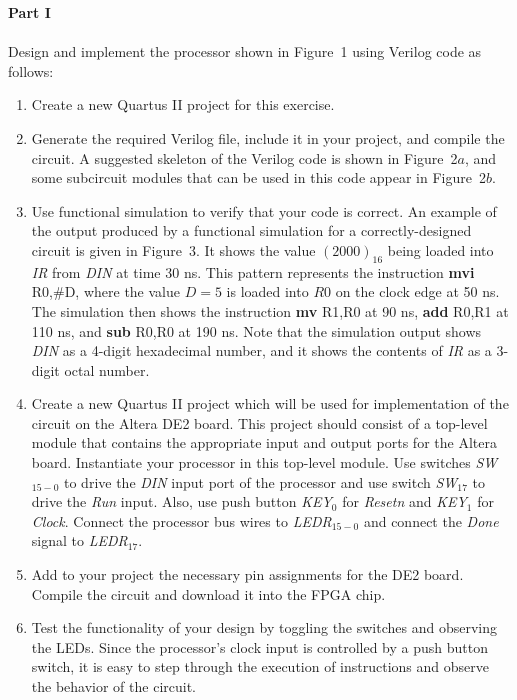 \documentclass[epsfig,10pt,fullpage]{article}
\begin{document}
\pagebreak
\noindent
{\bf Part I}
~\\
~\\
\noindent
Design and implement the processor shown in Figure~1 using Verilog code as follows:
\begin{enumerate}
\item Create a new Quartus II project for this exercise.
\item Generate the required Verilog file, include it in your project, 
and compile the circuit. A suggested skeleton of the Verilog code is shown in Figure~2$a$,
and some subcircuit modules that can be used in this code appear in Figure~2$b$.
\item Use functional simulation to verify that your code is correct. An example of the output
produced by a functional simulation for a correctly-designed circuit is given in Figure~3.
It shows the value ${(2000)}_{16}$ being loaded into {\it IR} from {\it DIN} at time 30 ns. This
pattern represents the instruction {\bf mvi} R0,\#D, where the value $D = 5$ is loaded
into $R0$ on
the clock edge at 50 ns. The simulation then shows the instruction {\bf mv} R1,R0 at 90
ns, {\bf add} R0,R1 at 110 ns, and {\bf sub} R0,R0 at 190 ns. 
Note that the simulation output shows {\it DIN} as a 4-digit
hexadecimal number, and it shows the contents of {\it IR} as a 3-digit octal number.
\item Create a new Quartus II project which will be used for implementation of the 
circuit on the Altera DE2 board. This project should consist of a top-level module that
contains the appropriate input and output ports for the Altera board. Instantiate your
processor in this top-level module. Use switches {\it SW}$_{15-0}$ to drive the {\it DIN} input 
port of the processor and use switch {\it SW}$_{17}$ to drive the {\it Run} input. Also, use 
push button {\it KEY}$_0$ for {\it Resetn} and {\it KEY}$_1$ for {\it Clock}.
Connect the processor bus wires to {\it LEDR}$_{15-0}$ and connect the {\it Done} signal to
{\it LEDR}$_{17}$.
\item Add to your project the necessary pin assignments for the 
DE2 board.  Compile the circuit and download it into the FPGA chip.
\item Test the functionality of your design by toggling the switches
and observing the LEDs. Since the processor's clock input is controlled by a push button
switch, it is easy to step through the execution of instructions and observe the behavior
of the circuit.
\end{enumerate}
\end{document}
